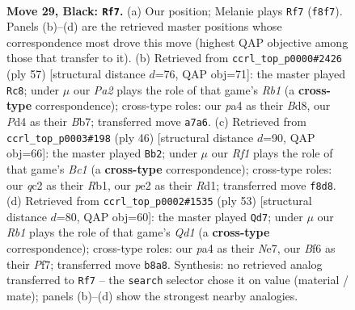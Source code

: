 \documentclass[11pt]{article}
\begin{document}
\clearpage

\begin{figure}[p]\centering
\begin{subfigure}{0.46\textwidth}\centering
\resizebox{\linewidth}{!}{%
\newchessgame
\chessboard[
  setfen={1rb2rk1/p2n3p/5b2/2pq4/Pp1p1P2/1P4N1/R1Q1PK2/1NB4R b - - 5 29},
  showmover=false,
  pgfstyle=straightmove, color=movearrow, markmove={f8-f7}
]}
\caption{}
\end{subfigure}\hfill
\begin{subfigure}{0.46\textwidth}\centering
\resizebox{\linewidth}{!}{%
\newchessgame
\chessboard[
  setfen={1r1br1k1/1bq3pp/p2ppn2/8/2P1P3/1PNQ4/2B3PP/R4RBK b - - 4 29},
  showmover=false,
  pgfstyle=straightmove, color=movearrow, markmove={b8-c8}
]}
\caption{}
\end{subfigure}
\\[4pt]
\begin{subfigure}{0.46\textwidth}\centering
\resizebox{\linewidth}{!}{%
\newchessgame
\chessboard[
  setfen={3r1bk1/1b1q1ppp/5n2/1ppP4/r7/P3N1P1/2Q2PBP/1RBR2K1 w - - 2 24},
  showmover=false,
  pgfstyle=straightmove, color=movearrow, markmove={c1-b2}
]}
\caption{}
\end{subfigure}\hfill
\begin{subfigure}{0.46\textwidth}\centering
\resizebox{\linewidth}{!}{%
\newchessgame
\chessboard[
  setfen={3q1rk1/4npb1/2r3b1/3p2p1/2pP2P1/P3P1N1/5PBN/R1RQ2K1 b - - 4 27},
  showmover=false,
  pgfstyle=straightmove, color=movearrow, markmove={d8-d7}
]}
\caption{}
\end{subfigure}
\caption{\textbf{Move 29, Black: \texttt{Rf7}.} (a) Our position; Melanie plays \texttt{Rf7} (\texttt{f8f7}). Panels (b)--(d) are the retrieved master positions whose correspondence most drove this move (highest QAP objective among those that transfer to it). (b) Retrieved from \texttt{ccrl\_top\_p0000\#2426} (ply 57) [structural distance $d$=76, QAP obj=71]: the master played \texttt{Rc8}; under $\mu$ our \emph{Pa2} plays the role of that game's \emph{Rb1} (a \textbf{cross-type} correspondence); cross-type roles: our \emph{p}a4 as their \emph{B}d8, our \emph{P}d4 as their \emph{B}b7; transferred move \texttt{a7a6}. (c) Retrieved from \texttt{ccrl\_top\_p0003\#198} (ply 46) [structural distance $d$=90, QAP obj=66]: the master played \texttt{Bb2}; under $\mu$ our \emph{Rf1} plays the role of that game's \emph{Bc1} (a \textbf{cross-type} correspondence); cross-type roles: our \emph{q}c2 as their \emph{R}b1, our \emph{p}e2 as their \emph{R}d1; transferred move \texttt{f8d8}. (d) Retrieved from \texttt{ccrl\_top\_p0002\#1535} (ply 53) [structural distance $d$=80, QAP obj=60]: the master played \texttt{Qd7}; under $\mu$ our \emph{Rb1} plays the role of that game's \emph{Qd1} (a \textbf{cross-type} correspondence); cross-type roles: our \emph{p}a4 as their \emph{N}e7, our \emph{B}f6 as their \emph{P}f7; transferred move \texttt{b8a8}. Synthesis: no retrieved analog transferred to \texttt{Rf7} -- the \texttt{search} selector chose it on value (material / mate); panels (b)--(d) show the strongest nearby analogies.}
\label{fig:thought-m57}
\end{figure}
\end{document}
